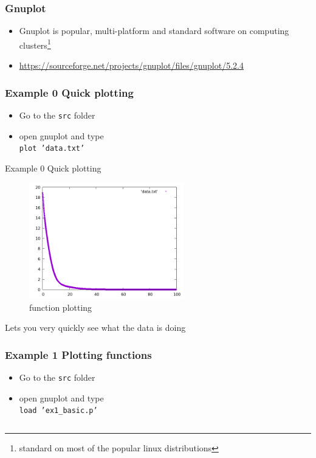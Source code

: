 \documentclass{beamer}
\begin{document}
\begin{frame}
\frametitle{Gnuplot} 
\begin{itemize}
	\item Gnuplot is popular, multi-platform and standard software on computing clusters\footnote{standard on most of the popular linux distributions} 
    \item \url{https://sourceforge.net/projects/gnuplot/files/gnuplot/5.2.4}
\end{itemize}
\end{frame}

\begin{frame}[fragile]
    \frametitle{Example 0 Quick plotting}
\begin{itemize}
	\item Go to the \texttt{src} folder
    \item open gnuplot and type \\ \texttt{plot 'data.txt'}
\end{itemize}
\end{frame}

\begin{frame}{Example 0 Quick plotting}
    \begin{figure}
	\centering
	\includegraphics[width=0.6\textwidth]{src/data.png}
	\caption{function plotting}
	\label{fig:function}
\end{figure}
Lets you very quickly see what the data is doing
\end{frame}

\begin{frame}[fragile]
    \frametitle{Example 1 Plotting functions}
\begin{itemize}
	\item Go to the \texttt{src} folder
    \item open gnuplot and type \\ \texttt{load 'ex1\_basic.p'}
\end{itemize}
\inputminted[fontsize=\small]{bash}{src/ex1_basic.p}
\end{frame}
\end{document}

